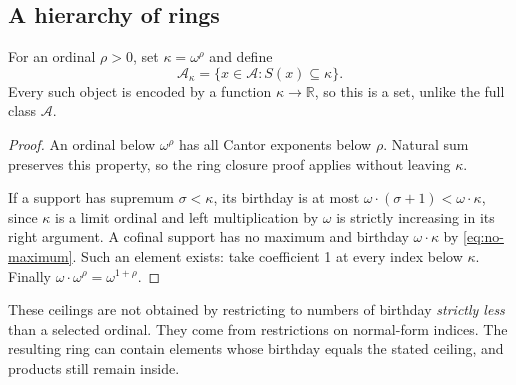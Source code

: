 \documentclass[11pt,letterpaper]{article}
\newtheorem{proposition}[theorem]{Proposition}
\theoremstyle{definition}
\theoremstyle{remark}
\newcommand{\R}{\mathbb{R}}
\newcommand{\A}{\mathscr{A}}
\newcommand{\bd}{\ell}
\begin{document}
\subsection{A hierarchy of rings}
For an ordinal \(\rho>0\), set \(\kappa=\omega^\rho\) and define
\begin{equation}\label{eq:bounded-ring}
 \A_\kappa=\{x\in\A:S(x)\subseteq\kappa\}.
\end{equation}
Every such object is encoded by a function \(\kappa\to\R\), so this
is a set, unlike the full class \(\A\).

\begin{proof}
An ordinal below \(\omega^\rho\) has all Cantor exponents below
\(\rho\). Natural sum preserves this property, so the ring closure
proof applies without leaving \(\kappa\).

If a support has supremum \(\sigma<\kappa\), its birthday is at most
\(\omega\cdot(\sigma+1)<\omega\cdot\kappa\), since \(\kappa\)
is a limit ordinal and left multiplication by \(\omega\) is strictly
increasing in its right argument. A cofinal support has no maximum and
birthday \(\omega\cdot\kappa\) by \eqref{eq:no-maximum}. Such an
element exists: take coefficient 1 at every index below \(\kappa\).
Finally \(\omega\cdot\omega^\rho=\omega^{1+\rho}\).
\end{proof}

These ceilings are not obtained by restricting to numbers of birthday
\emph{strictly less} than a selected ordinal. They come from restrictions
on normal-form indices. The resulting ring can contain elements whose
birthday equals the stated ceiling, and products still remain inside.
\end{document}
